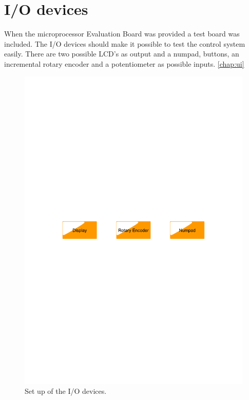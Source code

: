 \section{I/O devices}\label{sec:iodevices}

When the microprocessor Evaluation Board was provided a test board was included. The I/O devices should make it possible to test the control system easily. There are two possible LCD's as output and a numpad, buttons, an incremental rotary encoder and a potentiometer as possible inputs. \ref{chap:ui}
\begin{figure}[htb]
	\centering
	\includegraphics[scale=0.5,clip,trim=00 400 00 400]{graphics/iodevices} %
	\caption{Set up of the I/O devices.}
	\label{fig:iodevices}			%
\end{figure}


